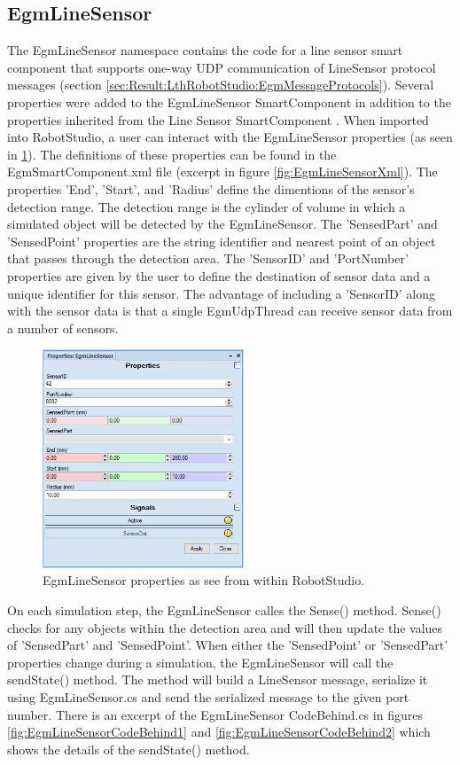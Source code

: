 \documentclass{cslthse-msc}
\begin{document}
\subsection{EgmLineSensor}
\label{sec:Result:LthRobotStudio:EgmLineSensor}
The EgmLineSensor namespace contains the code for a line sensor smart component that supports one-way UDP communication of LineSensor protocol messages (section \ref{sec:Result:LthRobotStudio:EgmMessageProtocols}). Several properties were added to the EgmLineSensor SmartComponent in addition to the properties inherited from the Line Sensor SmartComponent \cite{ABB:Line_Sensor}. When imported into RobotStudio, a user can interact with the EgmLineSensor properties (as seen in \ref{fig:egm_line_sensor_properties}). The definitions of these properties can be found in the EgmSmartComponent.xml file (excerpt in figure \ref{fig:EgmLineSensorXml}). The properties 'End', 'Start', and 'Radius' define the dimentions of the sensor's detection range. The detection range is the cylinder of volume in which a simulated object will be detected by the EgmLineSensor. The 'SensedPart' and 'SensedPoint' properties are the string identifier and nearest point of an object that passes through the detection area. The 'SensorID' and 'PortNumber' properties are given by the user to define the destination of sensor data and a unique identifier for this sensor. The advantage of including a 'SensorID' along with the sensor data is that a single EgmUdpThread can receive sensor data from a number of sensors. 

\begin{figure}[H]
    \centering
    \includegraphics[width=6cm]{line_sensor_properties.png}
    \caption{EgmLineSensor properties as see from within RobotStudio.}
    \label{fig:egm_line_sensor_properties}
\end{figure}

On each simulation step, the EgmLineSensor calles the Sense() method. Sense() checks for any objects within the detection area and will then update the values of 'SensedPart' and 'SensedPoint'. When either the 'SensedPoint' or 'SensedPart' properties change during a simulation, the EgmLineSensor will call the sendState() method. The method will build a LineSensor message, serialize it using EgmLineSensor.cs and send the serialized message to the given port number. There is an excerpt of the EgmLineSensor CodeBehind.cs in figures \ref{fig:EgmLineSensorCodeBehind1} and \ref{fig:EgmLineSensorCodeBehind2} which shows the details of the sendState() method. \par
\end{document}
